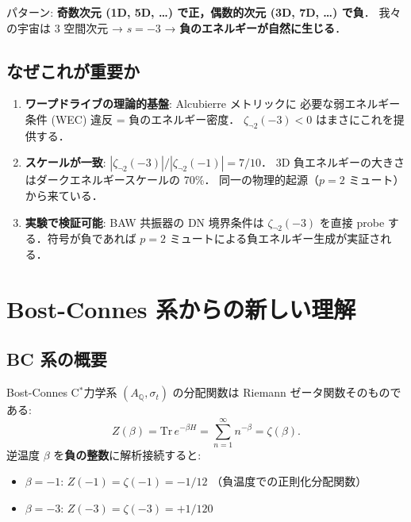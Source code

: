 \documentclass[11pt,a4paper]{article}
\begin{document}
\noindent
パターン: \textbf{奇数次元 (1D, 5D, \ldots) で正，偶数的次元 (3D, 7D, \ldots) で負}．
我々の宇宙は 3 空間次元 → $s=-3$ → \textbf{負のエネルギーが自然に生じる}．

\subsection{なぜこれが重要か}

\begin{enumerate}
\item \textbf{ワープドライブの理論的基盤}: Alcubierre メトリックに
必要な弱エネルギー条件 (WEC) 違反 = 負のエネルギー密度．
$\zeta_{\neg 2}(-3) < 0$ はまさにこれを提供する．

\item \textbf{スケールが一致}: $|\zeta_{\neg 2}(-3)|/|\zeta_{\neg 2}(-1)| = 7/10$．
3D 負エネルギーの大きさはダークエネルギースケールの 70\%．
同一の物理的起源（$p=2$ ミュート）から来ている．

\item \textbf{実験で検証可能}: BAW 共振器の DN 境界条件は
$\zeta_{\neg 2}(-3)$ を直接 probe する．符号が負であれば
$p=2$ ミュートによる負エネルギー生成が実証される．
\end{enumerate}


\section{Bost-Connes 系からの新しい理解}

\subsection{BC 系の概要}

Bost-Connes C$^*$力学系 $(A_{\mathbb{Q}}, \sigma_t)$ の分配関数は
Riemann ゼータ関数そのものである:
\begin{equation}
  Z(\beta) = \mathrm{Tr}\,e^{-\beta H} = \sum_{n=1}^{\infty} n^{-\beta} = \zeta(\beta).
\end{equation}
%
逆温度 $\beta$ を\textbf{負の整数}に解析接続すると:
\begin{itemize}
\item $\beta = -1$: $Z(-1) = \zeta(-1) = -1/12$ （負温度での正則化分配関数）
\item $\beta = -3$: $Z(-3) = \zeta(-3) = +1/120$
\end{itemize}
\end{document}
